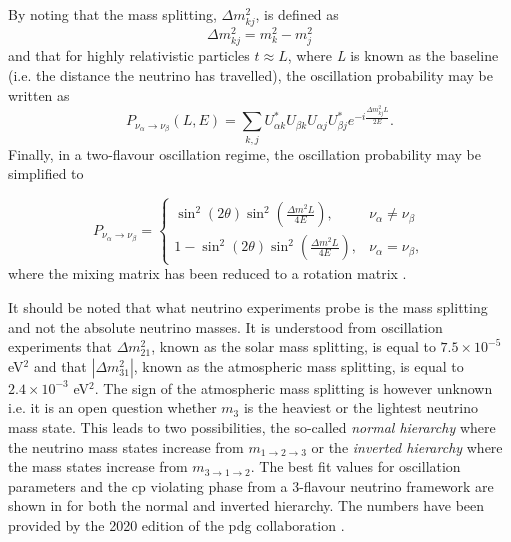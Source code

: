By noting that the mass splitting, $\Delta m^2_{kj}$, is defined as 
\begin{equation}
    \Delta m^2_{kj} = m_k^2 - m_j^2
\end{equation}
and that for highly relativistic particles $t \approx L$, where \textit{L} is known as the baseline (i.e. the distance the neutrino has travelled), the oscillation probability may be written as 
\begin{equation}
     P_{\nu_\alpha \rightarrow \nu_\beta}(L,E) = \sum_{k,j} U^*_{\alpha k} U_{\beta k} U_{\alpha j} U^*_{\beta j} e^{-i\frac{\Delta m^2_{kj}L}{2E}}.
\end{equation}
Finally, in a two-flavour oscillation regime, the oscillation probability may be simplified to

\begin{equation}
  P_{\nu_\alpha \rightarrow \nu_\beta}=\begin{cases}
    \sin^2(2\theta)\sin^2{(\frac{\Delta m^2L}{4E})}, & \nu_\alpha \neq \nu_\beta \\
    1 - \sin^2(2\theta)\sin^2{(\frac{\Delta m^2L}{4E})}, & \nu_{\alpha} = \nu_{\beta},
  \end{cases}
  \label{eqn:osc_probability}
\end{equation}
where the mixing matrix has been reduced to a rotation matrix \cite{Fundamentals_of_Neutrino_Physics_and_Astrophysics}. 

It should be noted that what neutrino experiments probe is the mass splitting and not the absolute neutrino masses. It is understood from oscillation experiments that $\Delta m_{21}^2$, known as the solar mass splitting, is equal to $7.5 \times 10^{-5}$ eV$^2$ and that $|\Delta m_{31}^2|$, known as the atmospheric mass splitting, is equal to $2.4 \times 10^{-3}$ eV$^2$. The sign of the atmospheric mass splitting is however unknown i.e. it is an open question whether $m_3$ is the heaviest or the lightest neutrino mass state. This leads to two possibilities, the so-called \textit{normal hierarchy} where the neutrino mass states increase from $m_{1 \rightarrow 2 \rightarrow 3}$ or the \textit{inverted hierarchy} where the mass states increase from $m_{3 \rightarrow 1 \rightarrow 2}$. The best fit values for oscillation parameters and the \gls{cp} violating phase from a 3-flavour neutrino framework are shown in  for both the normal and inverted hierarchy. The numbers have been provided by the 2020 edition of the \gls{pdg} collaboration \cite{PDG_2020}. 

